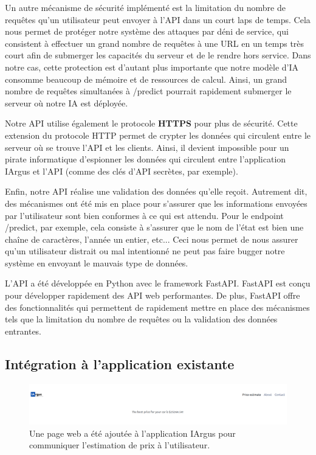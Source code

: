 \documentclass[french]{article}
\begin{document}
    Un autre mécanisme de sécurité implémenté est la limitation du nombre de requêtes qu'un utilisateur peut envoyer à l'API dans un court laps de temps. Cela nous permet de protéger notre système des attaques par déni de service, qui consistent à effectuer un grand nombre de requêtes à une URL en un temps très court afin de submerger les capacités du serveur et de le rendre hors service. Dans notre cas, cette protection est d'autant plus importante que notre modèle d'IA consomme beaucoup de mémoire et de ressources de calcul. Ainsi, un grand nombre de requêtes simultanées à /predict pourrait rapidement submerger le serveur où notre IA est déployée.

    Notre API utilise également le protocole \textbf{HTTPS} pour plus de sécurité. Cette extension du protocole HTTP permet de crypter les données qui circulent entre le serveur où se trouve l'API et les clients. Ainsi, il devient impossible pour un pirate informatique d'espionner les données qui circulent entre l'application IArgus et l'API (comme des clés d'API secrètes, par exemple).

    Enfin, notre API réalise une validation des données qu'elle reçoit. Autrement dit, des mécanismes ont été mis en place pour s'assurer que les informations envoyées par l'utilisateur sont bien conformes à ce qui est attendu. Pour le endpoint /predict, par exemple, cela consiste à s'assurer que le nom de l'état est bien une chaîne de caractères, l'année un entier, etc... Ceci nous permet de nous assurer qu'un utilisateur distrait ou mal intentionné ne peut pas faire bugger notre système en envoyant le mauvais type de données.

    L'API a été développée en Python avec le framework FastAPI. FastAPI est conçu pour développer rapidement des API web performantes. De plus, FastAPI offre des fonctionnalités qui permettent de rapidement mettre en place des mécanismes tels que la limitation du nombre de requêtes ou la validation des données entrantes.

    \subsection{Intégration à l'application existante}

    \begin{figure}[h!]
        \includegraphics[width=12cm]{prediction_result}
        \centering
        \caption{Une page web a été ajoutée à l'application IArgus pour communiquer l'estimation de prix à l'utilisateur.}
    \end{figure}
\end{document}
